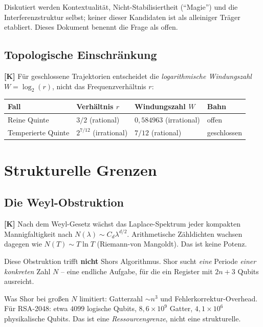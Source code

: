 Diskutiert werden Kontextualität, Nicht-Stabilisiertheit
(``Magie'') und die Interferenzstruktur selbst; keiner dieser
Kandidaten ist als alleiniger Träger etabliert. Dieses Dokument benennt
die Frage als offen.

\subsection{Topologische Einschränkung}

\textbf{[K]} Für geschlossene Trajektorien entscheidet die
\emph{logarithmische Windungszahl} $W = \log_2(r)$, nicht das
Frequenzverhältnis $r$:

\begin{center}
\begin{tabular}{llll}
\toprule
Fall & Verhältnis $r$ & Windungszahl $W$ & Bahn \\
\midrule
Reine Quinte & $3/2$ (rational) & $0{,}584963$ (irrational) & offen \\
Temperierte Quinte & $2^{7/12}$ (irrational) & $7/12$ (rational) & geschlossen \\
\bottomrule
\end{tabular}
\end{center}

\section{Strukturelle Grenzen}
\label{sec:weyl}

\subsection{Die Weyl-Obstruktion}

\textbf{[K]} Nach dem Weyl-Gesetz wächst das Laplace-Spektrum jeder
kompakten Mannigfaltigkeit nach $N(\lambda) \sim C_d\lambda^{d/2}$.
Arithmetische Zähldichten wachsen dagegen wie $N(T) \sim T\ln T$
(Riemann-von Mangoldt). Das ist keine Potenz.

\begin{keyresult}
Diese Obstruktion trifft \textbf{nicht} Shors Algorithmus. Shor sucht
\emph{eine} Periode \emph{einer konkreten} Zahl $N$ -- eine endliche
Aufgabe, für die ein Register mit $2n+3$ Qubits ausreicht.

Was Shor bei großen $N$ limitiert: Gatterzahl $\sim n^3$ und
Fehlerkorrektur-Overhead. Für RSA-2048: etwa $4099$ logische Qubits,
$8{,}6\times10^9$ Gatter, $4{,}1\times10^6$ physikalische Qubits.
Das ist eine \emph{Ressourcengrenze}, nicht eine strukturelle.
\end{keyresult}

